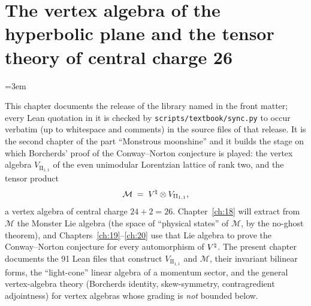 \chapter{The vertex algebra of the hyperbolic plane and the tensor theory of central charge 26}\label{ch:17}
\begingroup
\emergencystretch=3em
\providecommand{\chseventeenL}[1]{\texttt{\directlua{ local s = "\luaescapestring{\detokenize{#1}}" local first = true for c in s:gmatch(utf8.charpattern) do if (not first) and c:match("^[A-Z]$") then tex.sprint("\string\\allowbreak{}") end tex.sprint(-2, c) if c == "_" or c == "." then tex.sprint("\string\\allowbreak{}") end first = false end}}}

\providecommand{\chseventeenII}{{\mathrm{II}_{1,1}}}
\providecommand{\chseventeenVII}{{V_{\mathrm{II}_{1,1}}}}
\providecommand{\chseventeenvac}{\mathbb{1}}
\providecommand{\chseventeenF}{\mathcal{F}}
\providecommand{\chseventeenM}{\mathcal{M}}

This chapter documents the release of the library named in the front matter; every Lean quotation in it is checked by
\texttt{scripts/textbook/sync.py} to occur verbatim (up to whitespace and comments) in the source files of that
release.  It is
the second chapter of the part ``Monstrous moonshine'' and it builds the stage on which Borcherds' proof
of the Conway--Norton conjecture is played: the vertex algebra $\chseventeenVII$ of the even unimodular
Lorentzian lattice of rank two, and the tensor product
\begin{equation*}
  \chseventeenM \;=\; \Vnat\otimes\chseventeenVII ,
\end{equation*}
a vertex algebra of central charge $24+2=26$.  Chapter~\ref{ch:18} will extract from $\chseventeenM$ the
Monster Lie algebra (the space of ``physical states'' of $\chseventeenM$, by the no-ghost theorem), and
Chapters~\ref{ch:19}--\ref{ch:20} use that Lie algebra to prove the Conway--Norton conjecture for every
automorphism of ${V^{\natural}}$.  The present chapter documents the 91 Lean files that construct
$\chseventeenVII$ and $\chseventeenM$, their invariant bilinear forms, the ``light-cone'' linear algebra of a
momentum sector, and the general vertex-algebra theory (Borcherds identity, skew-symmetry, contragredient
adjointness) for vertex algebras whose grading is \emph{not} bounded below.

